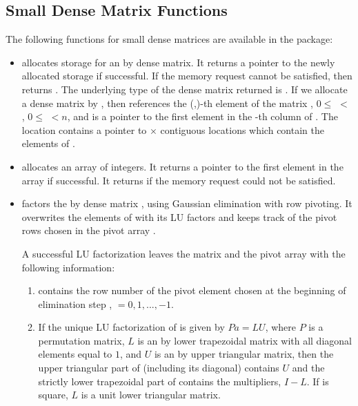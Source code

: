 \subsection{Small Dense Matrix Functions}
The following functions for small dense matrices are available in the
{\dense} package:
%
\begin{itemize}

\item {}
  \par {} allocates storage for an  by 
  dense matrix. It returns a pointer to the newly allocated storage if            
  successful. If the memory request cannot be satisfied, then    
   returns . The underlying type of the dense matrix 
  returned is . If we allocate a dense matrix  by 
  , then  references the (,)-th element   
  of the matrix , $0 \le$  $<$ , $0 \le$  $<n$, and  
  is a pointer to the first element in the -th column of . 
  The location  contains a pointer to  $\times$  contiguous 
  locations which contain the elements of .

\item {}
  \par {} allocates an array of  integers. 
  It returns a pointer to the first element in the array if successful. 
  It returns  if the memory request could not be satisfied.

\item {}
  \par {} factors the  by  dense matrix ,
  using Gaussian elimination with row pivoting. 
  It overwrites the elements of  with its LU factors and keeps track of the
  pivot rows chosen in the pivot array .

  A successful LU factorization leaves the matrix  and the      
  pivot array  with the following information:                  
  \begin{enumerate}
  \item 
     contains the row number of the pivot element chosen   
    at the beginning of elimination step , 
     $ = 0, 1, ..., $$-1$.  

  \item 
    If the unique LU factorization of  is given by $Pa = LU$,   
    where $P$ is a permutation matrix, $L$ is an  by 
    lower trapezoidal matrix with all diagonal elements equal to $1$, 
    and $U$ is an  by  upper triangular matrix, 
    then the upper triangular part of  (including its diagonal) 
    contains $U$ and the strictly lower trapezoidal part of  
    contains the multipliers, $I-L$. 
    If  is square, $L$ is a unit lower triangular matrix.
                      

\end{enumerate}
\end{itemize}

